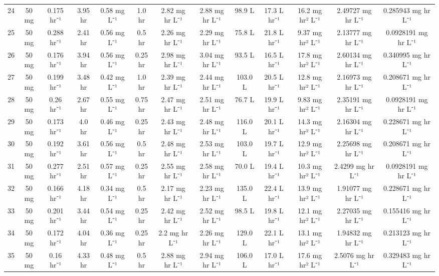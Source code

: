 \documentclass[12pt,a4paper]{article}
\begin{document}
\begin{tabular}{r|cccccccccccc}
	24 & 50 mg & 0.175 hr⁻¹ & 3.95 hr & 0.58 mg L⁻¹ & 1.0 hr & 2.82 mg hr L⁻¹ & 2.88 mg hr L⁻¹ & 98.9 L & 17.3 L hr⁻¹ & 16.2 mg hr² L⁻¹ & 2.49727 mg hr L⁻¹ & 0.285943 mg hr L⁻¹ \\
	25 & 50 mg & 0.288 hr⁻¹ & 2.41 hr & 0.56 mg L⁻¹ & 0.5 hr & 2.26 mg hr L⁻¹ & 2.29 mg hr L⁻¹ & 75.8 L & 21.8 L hr⁻¹ & 9.37 mg hr² L⁻¹ & 2.13777 mg hr L⁻¹ & 0.0928191 mg hr L⁻¹ \\
	26 & 50 mg & 0.176 hr⁻¹ & 3.94 hr & 0.56 mg L⁻¹ & 0.25 hr & 2.98 mg hr L⁻¹ & 3.04 mg hr L⁻¹ & 93.5 L & 16.5 L hr⁻¹ & 17.8 mg hr² L⁻¹ & 2.60134 mg hr L⁻¹ & 0.340995 mg hr L⁻¹ \\
	27 & 50 mg & 0.199 hr⁻¹ & 3.48 hr & 0.42 mg L⁻¹ & 1.0 hr & 2.39 mg hr L⁻¹ & 2.44 mg hr L⁻¹ & 103.0 L & 20.5 L hr⁻¹ & 12.8 mg hr² L⁻¹ & 2.16973 mg hr L⁻¹ & 0.208671 mg hr L⁻¹ \\
	28 & 50 mg & 0.26 hr⁻¹ & 2.67 hr & 0.55 mg L⁻¹ & 0.75 hr & 2.47 mg hr L⁻¹ & 2.51 mg hr L⁻¹ & 76.7 L & 19.9 L hr⁻¹ & 9.83 mg hr² L⁻¹ & 2.35191 mg hr L⁻¹ & 0.0928191 mg hr L⁻¹ \\
	29 & 50 mg & 0.173 hr⁻¹ & 4.0 hr & 0.46 mg L⁻¹ & 0.25 hr & 2.43 mg hr L⁻¹ & 2.48 mg hr L⁻¹ & 116.0 L & 20.1 L hr⁻¹ & 14.3 mg hr² L⁻¹ & 2.16304 mg hr L⁻¹ & 0.228671 mg hr L⁻¹ \\
	30 & 50 mg & 0.192 hr⁻¹ & 3.61 hr & 0.56 mg L⁻¹ & 0.5 hr & 2.48 mg hr L⁻¹ & 2.53 mg hr L⁻¹ & 103.0 L & 19.7 L hr⁻¹ & 12.9 mg hr² L⁻¹ & 2.25698 mg hr L⁻¹ & 0.208671 mg hr L⁻¹ \\
	31 & 50 mg & 0.277 hr⁻¹ & 2.51 hr & 0.57 mg L⁻¹ & 0.25 hr & 2.55 mg hr L⁻¹ & 2.58 mg hr L⁻¹ & 70.0 L & 19.4 L hr⁻¹ & 10.3 mg hr² L⁻¹ & 2.4299 mg hr L⁻¹ & 0.0928191 mg hr L⁻¹ \\
	32 & 50 mg & 0.166 hr⁻¹ & 4.18 hr & 0.34 mg L⁻¹ & 0.5 hr & 2.17 mg hr L⁻¹ & 2.23 mg hr L⁻¹ & 135.0 L & 22.4 L hr⁻¹ & 13.9 mg hr² L⁻¹ & 1.91077 mg hr L⁻¹ & 0.228671 mg hr L⁻¹ \\
	33 & 50 mg & 0.201 hr⁻¹ & 3.44 hr & 0.54 mg L⁻¹ & 0.25 hr & 2.42 mg hr L⁻¹ & 2.52 mg hr L⁻¹ & 98.5 L & 19.8 L hr⁻¹ & 12.1 mg hr² L⁻¹ & 2.27035 mg hr L⁻¹ & 0.155416 mg hr L⁻¹ \\
	34 & 50 mg & 0.172 hr⁻¹ & 4.04 hr & 0.36 mg L⁻¹ & 0.25 hr & 2.2 mg hr L⁻¹ & 2.26 mg hr L⁻¹ & 129.0 L & 22.1 L hr⁻¹ & 13.1 mg hr² L⁻¹ & 1.94832 mg hr L⁻¹ & 0.213123 mg hr L⁻¹ \\
	35 & 50 mg & 0.16 hr⁻¹ & 4.33 hr & 0.48 mg L⁻¹ & 0.5 hr & 2.88 mg hr L⁻¹ & 2.94 mg hr L⁻¹ & 106.0 L & 17.0 L hr⁻¹ & 17.6 mg hr² L⁻¹ & 2.5076 mg hr L⁻¹ & 0.329483 mg hr L⁻¹ \\

\end{tabular}
\end{document}
